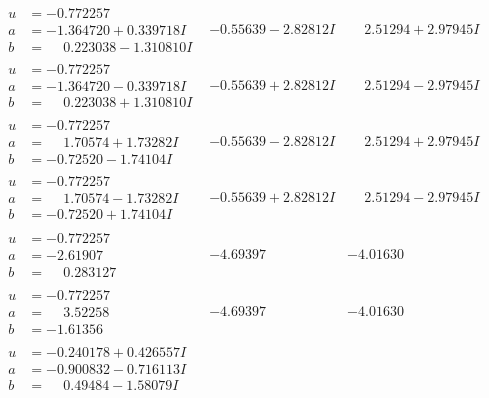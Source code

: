 \documentclass[1p]{elsarticle_modified}
\theoremstyle{definition}
\begin{document}
$$\begin{array}{c|c|c}
\begin{aligned}
u &= -0.772257\phantom{ +0.000000I} \\
a &= -1.364720 + 0.339718 I \\
b &= \phantom{-}0.223038 - 1.310810 I\end{aligned}
 & -0.55639 - 2.82812 I & \phantom{-}2.51294 + 2.97945 I \\ \hline\begin{aligned}
u &= -0.772257\phantom{ +0.000000I} \\
a &= -1.364720 - 0.339718 I \\
b &= \phantom{-}0.223038 + 1.310810 I\end{aligned}
 & -0.55639 + 2.82812 I & \phantom{-}2.51294 - 2.97945 I \\ \hline\begin{aligned}
u &= -0.772257\phantom{ +0.000000I} \\
a &= \phantom{-}1.70574 + 1.73282 I \\
b &= -0.72520 - 1.74104 I\end{aligned}
 & -0.55639 - 2.82812 I & \phantom{-}2.51294 + 2.97945 I \\ \hline\begin{aligned}
u &= -0.772257\phantom{ +0.000000I} \\
a &= \phantom{-}1.70574 - 1.73282 I \\
b &= -0.72520 + 1.74104 I\end{aligned}
 & -0.55639 + 2.82812 I & \phantom{-}2.51294 - 2.97945 I \\ \hline\begin{aligned}
u &= -0.772257\phantom{ +0.000000I} \\
a &= -2.61907\phantom{ +0.000000I} \\
b &= \phantom{-}0.283127\phantom{ +0.000000I}\end{aligned}
 & -4.69397\phantom{ +0.000000I} & -4.01630\phantom{ +0.000000I} \\ \hline\begin{aligned}
u &= -0.772257\phantom{ +0.000000I} \\
a &= \phantom{-}3.52258\phantom{ +0.000000I} \\
b &= -1.61356\phantom{ +0.000000I}\end{aligned}
 & -4.69397\phantom{ +0.000000I} & -4.01630\phantom{ +0.000000I} \\ \hline\begin{aligned}
u &= -0.240178 + 0.426557 I \\
a &= -0.900832 - 0.716113 I \\
b &= \phantom{-}0.49484 - 1.58079 I\end{aligned}

\end{array}$$
\end{document}
